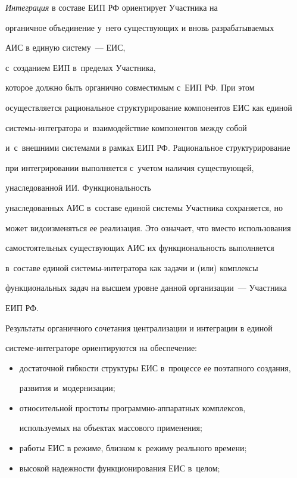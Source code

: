 \begin{enumerate}[1.]
     \textit{Интеграция} в составе ЕИП РФ ориентирует Участника на

органичное объединение у~него существующих и вновь разрабатываемых

АИС в единую систему~--- ЕИС,

с~созданием ЕИП в~пределах Участника,

которое должно быть органично совместимым с~ЕИП РФ. При этом

осуществляется рациональное структурирование компонентов ЕИС как единой

сис\-те\-мы-ин\-те\-гра\-то\-ра и~взаимодействие компонентов между собой

и~с~внешними системами в рамках ЕИП РФ. Рациональное структурирование

при интегрировании выполняется с~учетом наличия существующей,

унаследованной ИИ. Функциональность

унаследованных АИС в~со\-ста\-ве единой системы Участника сохраняется, но

может видоизменяться ее реализация. Это означает, что вместо использования

самостоятельных существующих АИС их функциональность выполняется

в~со\-ста\-ве единой сис\-те\-мы-ин\-тегра\-то\-ра как задачи и (или) комплексы

функциональных задач на высшем уровне данной организации~--- Участника

ЕИП РФ.



     Результаты органичного сочетания централизации и интеграции в единой

сис\-те\-ме-интеграторе ориентируются на обеспечение:

     \begin{itemize}

\item достаточной гибкости структуры ЕИС в~процессе ее поэтапного создания,

развития и~модернизации;

\item относительной простоты про\-грам\-мно-ап\-па\-рат\-ных комплексов,

используемых на объектах массового применения;

\item работы ЕИС в режиме, близком к~режиму реального времени;

\item высокой надежности функционирования ЕИС в~целом;


\end{itemize}
\end{enumerate}

